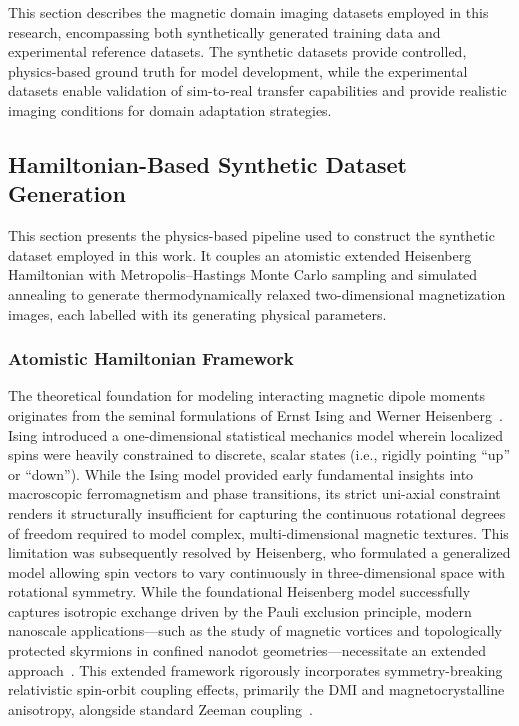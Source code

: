 \documentclass[letterpaper, 12, one column]{article}
\begin{document}
This section describes the magnetic domain imaging datasets employed in this research, encompassing both synthetically generated training data and experimental reference datasets. The synthetic datasets provide controlled, physics-based ground truth for model development, while the experimental datasets enable validation of sim-to-real transfer capabilities and provide realistic imaging conditions for domain adaptation strategies.

\subsection{Hamiltonian-Based Synthetic Dataset Generation}\label{sec:synthetic_dataset}

This section presents the physics-based pipeline used to construct the synthetic dataset employed in this work. It couples an atomistic extended Heisenberg Hamiltonian with Metropolis--Hastings Monte Carlo sampling and simulated annealing to generate thermodynamically relaxed two-dimensional magnetization images, each labelled with its generating physical parameters.

\subsubsection{Atomistic Hamiltonian Framework}\label{sec:hamiltonian}

The theoretical foundation for modeling interacting magnetic dipole moments originates from the seminal formulations of Ernst Ising and Werner Heisenberg~\cite{agudelo2019study}. Ising introduced a one-dimensional statistical mechanics model wherein localized spins were heavily constrained to discrete, scalar states (i.e., rigidly pointing ``up'' or ``down''). While the Ising model provided early fundamental insights into macroscopic ferromagnetism and phase transitions, its strict uni-axial constraint renders it structurally insufficient for capturing the continuous rotational degrees of freedom required to model complex, multi-dimensional magnetic textures. This limitation was subsequently resolved by Heisenberg, who formulated a generalized model allowing spin vectors to vary continuously in three-dimensional space with rotational symmetry. While the foundational 
Heisenberg model successfully captures isotropic exchange driven by the Pauli exclusion principle, modern nanoscale applications—such as the study of magnetic vortices and topologically protected skyrmions in confined nanodot geometries—necessitate an extended 
approach~\cite{fert2024electrical}. This extended framework rigorously incorporates symmetry-breaking relativistic spin-orbit coupling effects, primarily the DMI and magnetocrystalline anisotropy, alongside standard Zeeman coupling~\cite{borisov2021heisenberg}.
\end{document}
